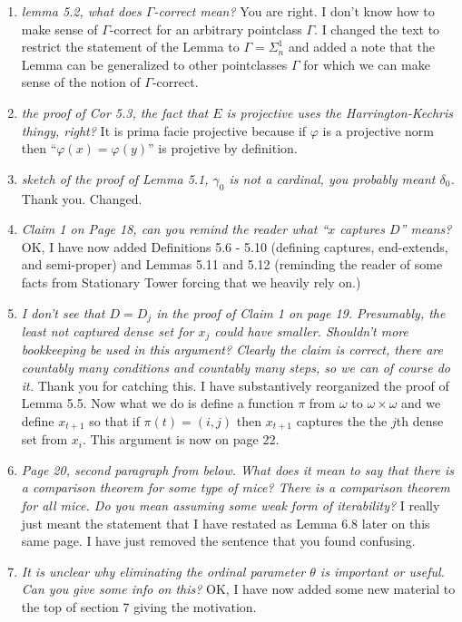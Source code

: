 \documentclass[oneside,12pt]{amsart}
\begin{document}
\begin{enumerate} [label=\arabic*)]
\item \emph{lemma 5.2, what does $\Gamma$-correct mean?}
You are right. I don’t know how to make sense of $\Gamma$-correct for an arbitrary pointclass $\Gamma$. I changed the text to restrict the statement of the Lemma to 
$\Gamma = \Sigma^1_n$ and added a note that the Lemma can be generalized to other pointclasses $\Gamma$ for which we can make sense of the notion of $\Gamma$-correct.

\item \emph{the proof of Cor 5.3, the fact that $E$ is projective uses the Harrington-Kechris thingy, right?} It is prima facie projective because if $\varphi$ is a projective norm then 
``$\varphi(x) = \varphi(y)$'' is projetive by definition.

\item \emph{sketch of the proof of Lemma 5.1, $\gamma_0$ is not a cardinal, you probably meant $\delta_0$.} Thank you. Changed.

\item \emph{Claim 1 on Page 18, can you remind the reader what ``$x$ captures $D$'' means?}
OK, I have now added Definitions 5.6 - 5.10 (defining captures, end-extends, and semi-proper) and Lemmas 5.11 and 5.12 (reminding the reader of some facts from Stationary Tower forcing that we heavily rely on.)

\item \emph{I don’t see that $D = D_j$
in the proof of Claim 1 on page 19. Presumably, the least not
captured dense set for $x_j$ could have smaller. Shouldn’t more bookkeeping be used in
this argument? Clearly the claim is correct, there are countably many conditions and
countably many steps, so we can of course do it.} Thank you for catching this. I have 
substantively reorganized the proof of Lemma 5.5. Now what we do is define a function $\pi$
from $\omega$ to 
$\omega \times \omega$ and we define $x_{t+1}$ so that if $\pi(t)=(i,j)$
 then $x_{t+1}$ captures the the $j$th dense set from $x_i$. This argument is now on page 22.

 \item \emph{Page 20, second paragraph from below. What does it mean to say that there is a comparison theorem for some type of mice? There is a comparison theorem for all mice. Do
you mean assuming some weak form of iterability?}
I really just meant the statement that I have restated as Lemma 6.8 later on this same page. I have just removed the sentence that you found confusing.

\item \emph{It is unclear why eliminating the ordinal parameter $\theta$ is important or useful. Can you give some info on this?}
OK, I have now added some new material to the top of section 7 giving the motivation.


\end{enumerate}
\end{document}
